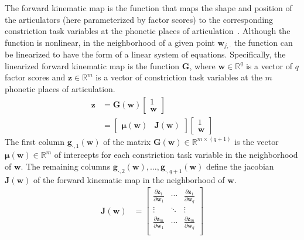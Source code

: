 \documentclass[preprint]{JASAnew}\usepackage[]{graphicx}\usepackage[]{color}
\begin{document}
The forward kinematic map is the function that maps the shape and position of the articulators (here parameterized by factor scores) to the corresponding constriction task variables at the phonetic places of articulation~\citep{lammert2013statistical}. 
%
Although the function is nonlinear, in the neighborhood of a given point $\mathbf{w}_{j,\cdot}$ the function can be linearized to have the form of a linear system of equations.
%
Specifically, the linearized forward kinematic map is the function $\mathbf{G}$, where $\mathbf{w} \in \mathbb{R}^q$ is a vector of $q$ factor scores and $\mathbf{z} \in \mathbb{R}^{m}$ is a vector of constriction task variables at the $m$ phonetic places of articulation. 
%
\begin{align}
\mathbf{z} 
&= 
\mathbf{G}\left( \mathbf{w} \right) 
\left[ \begin{array}{c} 1 \\ \mathbf{w} \end{array} \right] \\
&= 
\left[ \begin{array}{cc} 
\boldsymbol{\mu}\left(\mathbf{w}\right) & \mathbf{J}\left(\mathbf{w}\right) 
\end{array} \right]
\left[ \begin{array}{c} 1 \\ \mathbf{w} \end{array} \right]
\end{align}
%
The first column $\mathbf{g}_{\cdot,1}(\mathbf{w})$ of the matrix $\mathbf{G}(\mathbf{w}) \in \mathbb{R}^{m\times (q+1)}$ is the vector $\boldsymbol{\mu}(\mathbf{w}) \in \mathbb{R}^m$ of intercepts for each constriction task variable in the neighborhood of $\mathbf{w}$. 
%
The remaining columns $\mathbf{g}_{\cdot,2}(\mathbf{w}), \ldots, \mathbf{g}_{\cdot,q+1}(\mathbf{w})$ define the jacobian $\mathbf{J}(\mathbf{w})$ of the forward kinematic map in the neighborhood of $\mathbf{w}$. 
% 
\begin{align}
\mathbf{J}(\mathbf{w}) 
&=
\left[ \begin{array}{ccc} 
\frac{\partial \mathbf{z}_1}{\partial \mathbf{w}_1} & \cdots & \frac{\partial \mathbf{z}_1}{\partial \mathbf{w}_q} \\
\vdots & \ddots & \vdots \\
\frac{\partial \mathbf{z}_m}{\partial \mathbf{w}_1} & \cdots & \frac{\partial \mathbf{z}_m}{\partial \mathbf{w}_q} \\
\end{array} \right]
\end{align}
\end{document}
